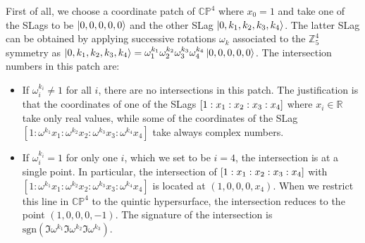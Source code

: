 First of all, we choose a coordinate patch of $\mathbb{CP}^4$ where $x_0=1$ and take one of the SLags to be $\ket{0,0,0,0,0}$
and the other SLag $\ket{0,k_1,k_2,k_3,k_4}$.
The latter SLag can  be  obtained by applying successive rotations $\omega_k$ associated to the $\mathbb Z_5^4$ symmetry
as $\ket{0,k_1,k_2,k_3,k_4}=\omega^{k_1}_1\omega^{k_2}_2\omega^{k_3}_3\omega^{k_4}_4\ket{0,0,0,0,0}$.
The intersection numbers in this patch are:
\begin{itemize}
  \item If $\omega_i^{k_i}\neq 1$ for all $i$, there are no intersections in this patch. 
    The justification is that the coordinates of one of the SLags $\qty[1:x_1:x_2:x_3:x_4]$ where $x_i\in\mathbb R$ take only real values,
    while some of the coordinates of the SLag $[1:\omega^{k_1}x_1:\omega^{k_2}x_2:\omega^{k_3}x_3:\omega^{k_4}x_4]$ take
    always complex numbers.

  \item If $\omega_i^{k_i}= 1$ for only one $i$, which we set to be $i=4$, the intersection 
    is at a single point.
    In particular, the intersection of $\qty[1:x_1:x_2:x_3:x_4]$ with $[1:\omega^{k_1}x_1:\omega^{k_2}x_2:\omega^{k_3}x_3:\omega^{k_4}x_4]$
    is located at $(1,0,0,0,x_4)$. 
    When we restrict this line in $\mathbb{CP}^4$ to the quintic hypersurface, the intersection reduces to the point $(1,0,0,0,-1)$.
    The signature of the intersection is $\mathrm{sgn}(\Im \omega^{k_1}\Im\omega^{k_2}\Im\omega^{k_3})$. 


\end{itemize}
